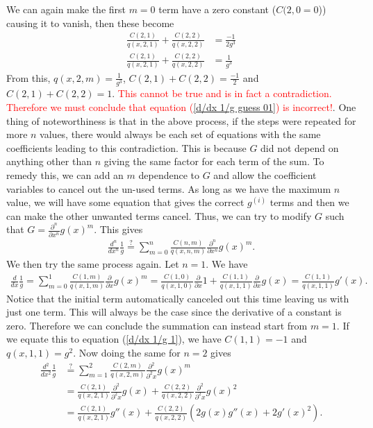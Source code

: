 We can again make the first $m=0$ term have a zero constant ($C(2,0=0$)) causing it to vanish, then these become 
\begin{align}
	\frac{C(2,1)}{q(x, 2, 1)} + \frac{C(2,2)}{q(x, 2, 2)} &= \frac{-1}{2g^3} \\	
	\frac{C(2,1)}{q(x, 2, 1)} + \frac{C(2,2)}{q(x, 2, 2)} &= \frac{1}{g^3}
\end{align}
From this, $q(x,2,m)=\frac{1}{g^3}$, $C(2,1)+C(2,2) = \frac{-1}{2}$ and $C(2,1) + C(2,2) = 1$. \textcolor{red}{This cannot be true and is in fact a contradiction. Therefore we must conclude that equation (\ref{d/dx 1/g guess 01}) is incorrect!}. One thing of noteworthiness is that in the above process, if the steps were repeated for more $n$ values, there would always be each set of equations with the same coefficients leading to this contradiction. This is because $G$ did not depend on anything other than $n$ giving the same factor for each term of the sum. To remedy this, we can add an $m$ dependence to $G$ and allow the coefficient variables to cancel out the un-used terms. As long as we have the maximum $n$ value, we will have some equation that gives the correct $g^{(i)}$ terms and then we can make the other unwanted terms cancel. Thus, we can try to modify $G$ such that $G = \frac{\partial^n}{\partial x^n}g(x)^m$. This gives
\begin{align}
	\frac{d^n}{dx^n}\frac{1}{g} \overset{?}{=} \sum_{m=0}^{n}\frac{C(n,m)}{q(x, n, m)}\frac{\partial^n}{\partial x^n}g(x)^m \label{d/dx 1/g guess 02}.
\end{align}
We then try the same process again. Let $n=1$. We have
\begin{align}
	\frac{d}{dx}\frac{1}{g} = \sum_{m=0}^{1}\frac{C(1,m)}{q(x, 1, m)}\frac{\partial}{\partial x}g(x)^m =\frac{C(1,0)}{q(x, 1, 0)}\frac{\partial}{\partial x}1 + \frac{C(1,1)}{q(x, 1, 1)}\frac{\partial}{\partial x}g(x) = \frac{C(1,1)}{q(x, 1, 1)}g'(x).
\end{align}
Notice that the initial term automatically canceled out this time leaving us with just one term. This will always be the case since the derivative of a constant is zero. Therefore we can conclude the summation can instead start from $m=1$. If we equate this to equation (\ref{d/dx 1/g 1}), we have $C(1,1) = -1$ and $q(x,1,1) = g^{2}$. Now doing the same for $n=2$ gives
\begin{align}
	\frac{d^2}{dx^2}\frac{1}{g} &\overset{?}{=} \sum_{m=1}^{2}\frac{C(2,m)}{q(x, 2, m)}\frac{\partial^2}{\partial^2 x}g(x)^m \\
	&= \frac{C(2,1)}{q(x, 2, 1)}\frac{\partial^2}{\partial^2 x}g(x) + \frac{C(2,2)}{q(x, 2, 2)}\frac{\partial^2}{\partial^2 x}g(x)^2 \\
	&= \frac{C(2,1)}{q(x, 2, 1)}g''(x) + \frac{C(2,2)}{q(x, 2, 2)}\left(2g(x)g''(x)+2g'(x)^2\right).
\end{align}
